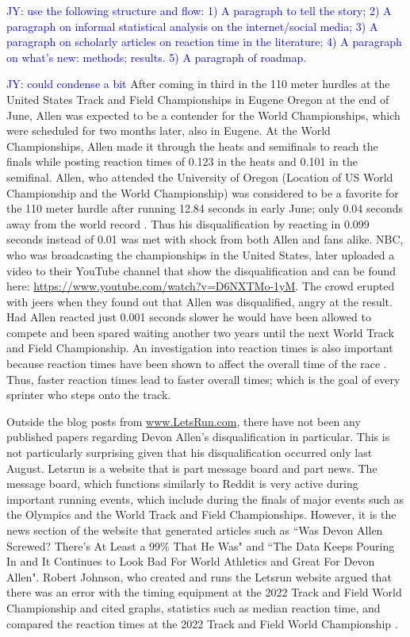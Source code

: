 \documentclass[12pt, letterpaper, titlepage]{article}
\newcommand{\jy}[1]{\textcolor{blue}{JY: #1}}
\begin{document}
\jy{use the following structure and flow:
  1) A paragraph to tell the story;
  2) A paragraph on informal statistical analysis on the internet/social media;
  3) A paragraph on scholarly articles on reaction time in the literature;
  4) A paragraph on what's new: methods; results.
  5) A paragraph of roadmap.}


\jy{could condense a bit}
After coming in third in the 110 meter hurdles at the United States Track and 
Field Championships in Eugene Oregon at the end of June, Allen was expected to 
be a contender for the World Championships, which were scheduled for two months 
later, also in Eugene. At the World Championships, Allen made it through the 
heats and semifinals to reach the finals while posting reaction times of 0.123
in the heats and 0.101 in the semifinal.  Allen, who attended the University
of Oregon (Location of US World Championship and the World Championship) was
considered to be a favorite for the 110 meter hurdle after running 12.84 seconds
in early June; only 0.04 seconds away from the world record \citep{wa2022preview}.
Thus his disqualification by reacting in 0.099 seconds instead of 0.01 was met
with shock from both Allen and fans alike.  NBC, who was broadcasting the
championships in the United States, later uploaded a video to their YouTube
channel that show the disqualification and can be found here:
\url{https://www.youtube.com/watch?v=D6NXTMo-1yM}. The crowd erupted with jeers when
they found out that Allen was disqualified, angry at the result.  Had Allen 
reacted just 0.001 seconds slower he would have been allowed to compete and been 
spared waiting another two years until the next World Track and Field Championship.
An investigation into reaction times is also important because reaction times have
been shown to affect the overall time of the race \citep{delalija2008reaction}.
Thus, faster reaction times lead to faster overall times; which is the goal of
every sprinter who steps onto the track.

Outside the blog posts from \url{www.LetsRun.com}, there have not been any published
papers regarding Devon Allen's disqualification in particular.  This is not
particularly surprising given that his disqualification occurred only last August.
Letsrun is a website that is part message board and part news.  The message board,
which functions similarly to Reddit is very active during important running
events, which include during the finals of major events such as
the Olympics and the World Track and Field Championships.  However, it is the
news section of the website that generated articles such as ``Was Devon Allen
Screwed? There's At Least a 99\% That He Was" and ``The Data Keeps Pouring In and
It Continues to Look Bad For World Athletics and Great For Devon Allen".  Robert
Johnson, who created and runs the Letsrun website argued that there was an error
with the timing equipment at the 2022 Track and Field World Championship and
cited graphs, statistics such as median reaction time, and compared the reaction
times at the 2022 Track and Field World Championship \citep{johnson2022devon}. 
\end{document}
